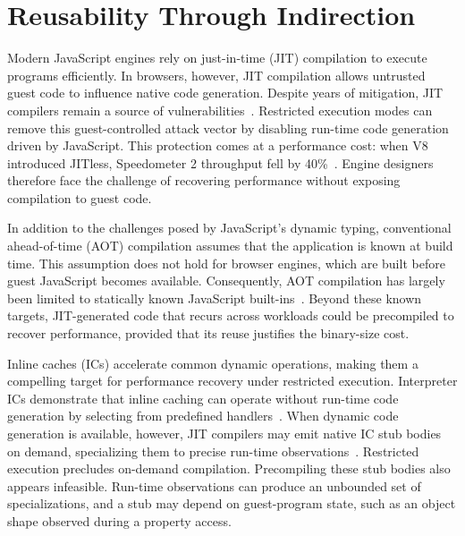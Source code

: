 \documentclass[sigplan,screen,review,anonymous]{acmart}
\begin{document}
\maketitle

\section{Reusability Through Indirection}

Modern JavaScript engines rely on just-in-time (JIT) compilation to execute programs efficiently. In browsers, however, JIT compilation allows untrusted guest code to influence native code generation. Despite years of mitigation, JIT compilers remain a source of vulnerabilities~\cite{gross2026state}. Restricted execution modes can remove this guest-controlled attack vector by disabling run-time code generation driven by JavaScript. This protection comes at a performance cost: when V8 introduced JITless, Speedometer 2 throughput fell by 40\%~\cite{gruber2019jitless}. Engine designers therefore face the challenge of recovering performance without exposing compilation to guest code.

In addition to the challenges posed by JavaScript's dynamic typing, conventional ahead-of-time (AOT) compilation assumes that the application is known at build time. This assumption does not hold for browser engines, which are built before guest JavaScript becomes available. Consequently, AOT compilation has largely been limited to statically known JavaScript built-ins~\cite{gruber2018builtins}. Beyond these known targets, JIT-generated code that recurs across workloads could be precompiled to recover performance, provided that its reuse justifies the binary-size cost.

Inline caches (ICs) accelerate common dynamic operations, making them a compelling target for performance recovery under restricted execution. Interpreter ICs demonstrate that inline caching can operate without run-time code generation by selecting from predefined handlers~\cite{brunthaler2010quickening}. When dynamic code generation is available, however, JIT compilers may emit native IC stub bodies on demand, specializing them to precise run-time observations~\cite{demooij2023cacheir, glew2004lil}. Restricted execution precludes on-demand compilation. Precompiling these stub bodies also appears infeasible. Run-time observations can produce an unbounded set of specializations, and a stub may depend on guest-program state, such as an object shape observed during a property access.
\end{document}
